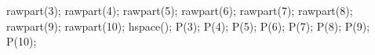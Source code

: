 \documentclass[
  letterpaper,
]{article}
\newenvironment{Shaded}{\begin{snugshade}}{\end{snugshade}}
\newcommand{\DecValTok}[1]{\textcolor[rgb]{0.68,0.00,0.00}{#1}}
\newcommand{\FunctionTok}[1]{\textcolor[rgb]{0.28,0.35,0.67}{#1}}
\newcommand{\NormalTok}[1]{\textcolor[rgb]{0.00,0.23,0.31}{#1}}
\begin{document}
\begin{Shaded}
\begin{Highlighting}[]
\FunctionTok{rawpart}\NormalTok{(}\DecValTok{3}\NormalTok{); }\FunctionTok{rawpart}\NormalTok{(}\DecValTok{4}\NormalTok{); }\FunctionTok{rawpart}\NormalTok{(}\DecValTok{5}\NormalTok{); }\FunctionTok{rawpart}\NormalTok{(}\DecValTok{6}\NormalTok{);}
\FunctionTok{rawpart}\NormalTok{(}\DecValTok{7}\NormalTok{); }\FunctionTok{rawpart}\NormalTok{(}\DecValTok{8}\NormalTok{); }\FunctionTok{rawpart}\NormalTok{(}\DecValTok{9}\NormalTok{); }\FunctionTok{rawpart}\NormalTok{(}\DecValTok{10}\NormalTok{);}
\FunctionTok{hspace}\NormalTok{();}
\FunctionTok{P}\NormalTok{(}\DecValTok{3}\NormalTok{);       }\FunctionTok{P}\NormalTok{(}\DecValTok{4}\NormalTok{);       }\FunctionTok{P}\NormalTok{(}\DecValTok{5}\NormalTok{);       }\FunctionTok{P}\NormalTok{(}\DecValTok{6}\NormalTok{);}
\FunctionTok{P}\NormalTok{(}\DecValTok{7}\NormalTok{);       }\FunctionTok{P}\NormalTok{(}\DecValTok{8}\NormalTok{);       }\FunctionTok{P}\NormalTok{(}\DecValTok{9}\NormalTok{);       }\FunctionTok{P}\NormalTok{(}\DecValTok{10}\NormalTok{);}
\end{Highlighting}
\end{Shaded}
\end{document}

